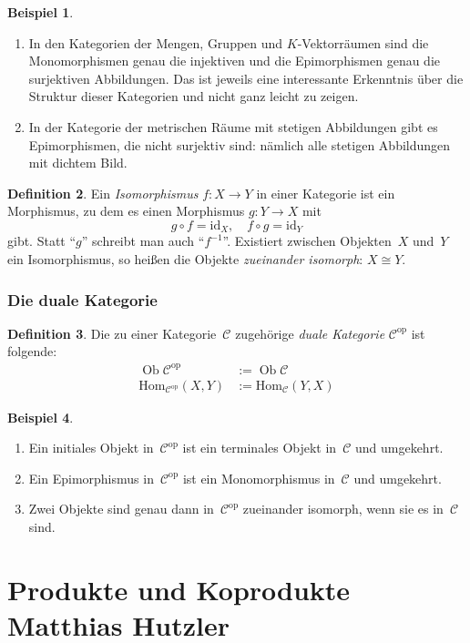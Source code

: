\documentclass[a4paper,ngerman]{scrartcl}
\theoremstyle{definition}
\newtheorem{defn}{Definition}[section]
\newtheorem{bsp}[defn]{Beispiel}
\theoremstyle{plain}
\theoremstyle{remark}
\newcommand{\C}{\mathcal{C}}
\newcommand{\Hom}{\mathrm{Hom}}
\newcommand{\id}{\mathrm{id}}
\DeclareMathOperator{\Ob}{Ob}
\newcommand{\op}{\mathrm{op}}
\begin{document}
\begin{bsp}\begin{enumerate}
\item In den Kategorien der Mengen, Gruppen und $K$-Vektorräumen sind die
Monomorphismen genau die injektiven und die Epimorphismen genau die
surjektiven Abbildungen. Das ist jeweils eine interessante Erkenntnis über die
Struktur dieser Kategorien und nicht ganz leicht zu zeigen.
\item In der Kategorie der metrischen Räume mit stetigen Abbildungen gibt es
Epimorphismen, die nicht surjektiv sind: nämlich alle stetigen Abbildungen mit
dichtem Bild.
\end{enumerate}\end{bsp}

\begin{defn}
Ein \emph{Isomorphismus} $f:X \to Y$ in einer Kategorie ist ein
Morphismus, zu dem es einen Morphismus $g:Y \to X$ mit
\[ g \circ f = \id_X, \quad f \circ g = \id_Y \]
gibt. Statt "`$g$"' schreibt man auch "`$f^{-1}$"'. Existiert zwischen
Objekten~$X$ und~$Y$ ein Isomorphismus, so heißen die Objekte \emph{zueinander
isomorph}:
$X \cong Y$.
\end{defn}


\subsubsection*{Die duale Kategorie}

\begin{defn}
Die zu einer Kategorie~$\C$ zugehörige \emph{duale Kategorie} $\C^\op$ ist
folgende:
\begin{align*}
  \Ob \C^\op &:= \Ob \C \\
  \Hom_{\C^\op}(X,Y) &:= \Hom_\C(Y,X)
\end{align*}
\end{defn}

\begin{bsp}\begin{enumerate}
\item Ein initiales Objekt in~$\C^\op$ ist ein terminales Objekt in~$\C$ und
umgekehrt.
\item Ein Epimorphismus in~$\C^\op$ ist ein Monomorphismus in~$\C$ und
umgekehrt.
\item Zwei Objekte sind genau dann in~$\C^\op$ zueinander isomorph, wenn sie es
in~$\C$ sind.
\end{enumerate}\end{bsp}


\section[Produkte und Koprodukte]{Produkte und Koprodukte \hfill \small
Matthias Hutzler}
\end{document}
